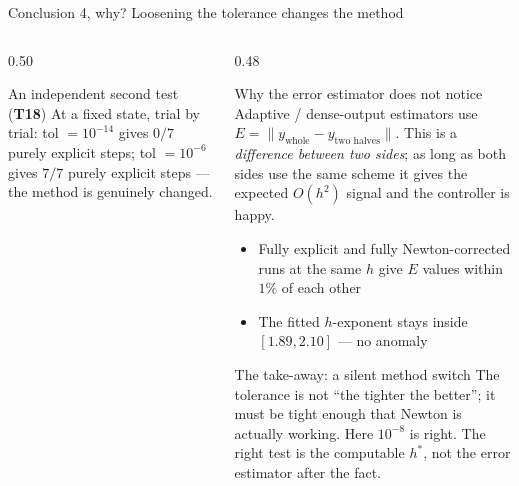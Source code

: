 \documentclass[aspectratio=169,10pt]{beamer}
\newcommand{\tab}[1]{\textbf{#1}}
\begin{document}
\begin{frame}{Conclusion 4, why?  Loosening the tolerance changes the method}
\begin{columns}[T]
\begin{column}{0.50\textwidth}
      \vspace{0.45em}
      \begin{block}{An independent second test (\tab{T18})}
        \footnotesize
        At a fixed state, trial by trial:
        tol $=10^{-14}$ gives \alert{$0/7$} purely explicit steps;
        tol $=10^{-6}$ gives \alert{$7/7$} purely explicit steps ---
        the method is genuinely changed.
      \end{block}
    \end{column}
    \begin{column}{0.48\textwidth}
      \begin{alertblock}{Why the error estimator does not notice}
        \footnotesize
        Adaptive / dense-output estimators use
        $E=\|y_{\text{whole}}-y_{\text{two halves}}\|$.
        This is a \emph{difference between two sides}; as long as both sides
        use the same scheme it gives the expected $O(h^2)$ signal and the
        controller is happy.
        \begin{itemize}
          \setlength{\itemsep}{0.05em}
          \item Fully explicit and fully Newton-corrected runs at the same $h$
                give $E$ values within $1\%$ of each other
          \item The fitted $h$-exponent stays inside $[1.89,2.10]$ --- no
                anomaly
        \end{itemize}
      \end{alertblock}
      \begin{block}{The take-away: a silent method switch}
        \footnotesize
        The tolerance is not ``the tighter the better''; it must be tight
        enough that Newton is \alert{actually working}.  Here $10^{-8}$ is
        right.  The right test is the computable $h^\ast$, not the error
        estimator after the fact.
      \end{block}
    \end{column}
  \end{columns}
\end{frame}
\end{document}
